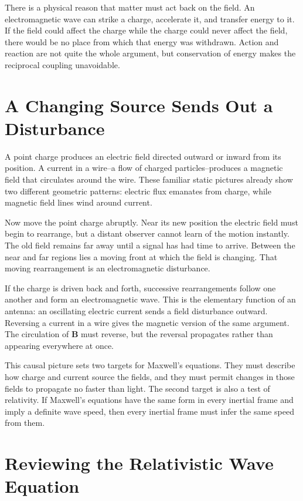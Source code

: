 There is a physical reason that matter must act back on the field. An electromagnetic wave can strike a charge, accelerate it, and transfer energy to it. If the field could affect the charge while the charge could never affect the field, there would be no place from which that energy was withdrawn. Action and reaction are not quite the whole argument, but conservation of energy makes the reciprocal coupling unavoidable.

\section{A Changing Source Sends Out a Disturbance}

A point charge produces an electric field directed outward or inward from its position. A current in a wire--a flow of charged particles--produces a magnetic field that circulates around the wire. These familiar static pictures already show two different geometric patterns: electric flux emanates from charge, while magnetic field lines wind around current.

Now move the point charge abruptly. Near its new position the electric field must begin to rearrange, but a distant observer cannot learn of the motion instantly. The old field remains far away until a signal has had time to arrive. Between the near and far regions lies a moving front at which the field is changing. That moving rearrangement is an electromagnetic disturbance.

If the charge is driven back and forth, successive rearrangements follow one another and form an electromagnetic wave. This is the elementary function of an antenna: an oscillating electric current sends a field disturbance outward. Reversing a current in a wire gives the magnetic version of the same argument. The circulation of \(\mathbf B\) must reverse, but the reversal propagates rather than appearing everywhere at once.

This causal picture sets two targets for Maxwell's equations. They must describe how charge and current source the fields, and they must permit changes in those fields to propagate no faster than light. The second target is also a test of relativity. If Maxwell's equations have the same form in every inertial frame and imply a definite wave speed, then every inertial frame must infer the same speed from them.

\section{Reviewing the Relativistic Wave Equation}

